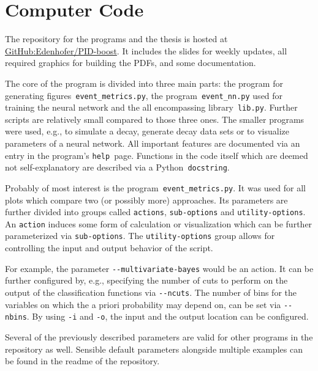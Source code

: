 \chapter{Computer Code}
\label{chap:computer_code}

The repository for the programs and the thesis is hosted at \href{https://github.com/Edenhofer/PID-boost}{GitHub:Edenhofer/PID-boost}. It includes the slides for weekly updates, all required graphics for building the PDFs, and some documentation.

The core of the program is divided into three main parts: the program for generating figures~\lstinline|event_metrics.py|, the program~\lstinline|event_nn.py| used for training the neural network and the all encompassing library~\lstinline|lib.py|. Further scripts are relatively small compared to those three ones. The smaller programs were used, e.g., to simulate a decay, generate decay data sets or to visualize parameters of a neural network. All important features are documented via an entry in the program's \lstinline|help|~page. Functions in the code itself which are deemed not self-explanatory are described via a Python~\lstinline|docstring|.

Probably of most interest is the program~\lstinline|event_metrics.py|. It was used for all plots which compare two (or possibly more) approaches. Its parameters are further divided into groups called \lstinline|actions|, \lstinline|sub-options| and \lstinline|utility-options|. An \lstinline|action| induces some form of calculation or visualization which can be further parameterized via \lstinline|sub-options|. The \lstinline|utility-options| group allows for controlling the input and output behavior of the script.

For example, the parameter \lstinline|--multivariate-bayes| would be an action. It can be further configured by, e.g., specifying the number of cuts to perform on the output of the classification functions via \lstinline|--ncuts|. The number of bins for the variables on which the a priori probability may depend on, can be set via \lstinline|--nbins|. By using \lstinline|-i| and \lstinline|-o|, the input and the output location can be configured.

Several of the previously described parameters are valid for other programs in the repository as well. Sensible default parameters alongside multiple examples can be found in the readme of the repository.

